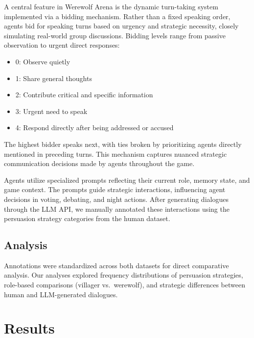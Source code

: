 \documentclass[
  letterpaper,
  DIV=11,
  numbers=noendperiod]{scrreprt}
\providecommand{\tightlist}{%
  \setlength{\itemsep}{0pt}\setlength{\parskip}{0pt}}
\begin{document}
A central feature in Werewolf Arena is the dynamic turn-taking system
implemented via a bidding mechanism. Rather than a fixed speaking order,
agents bid for speaking turns based on urgency and strategic necessity,
closely simulating real-world group discussions. Bidding levels range
from passive observation to urgent direct responses:

\begin{itemize}
\tightlist
\item
  0: Observe quietly
\item
  1: Share general thoughts
\item
  2: Contribute critical and specific information
\item
  3: Urgent need to speak
\item
  4: Respond directly after being addressed or accused
\end{itemize}

The highest bidder speaks next, with ties broken by prioritizing agents
directly mentioned in preceding turns. This mechanism captures nuanced
strategic communication decisions made by agents throughout the game.

Agents utilize specialized prompts reflecting their current role, memory
state, and game context. The prompts guide strategic interactions,
influencing agent decisions in voting, debating, and night actions.
After generating dialogues through the LLM API, we manually annotated
these interactions using the persuasion strategy categories from the
human dataset.

\section{Analysis}\label{analysis}

Annotations were standardized across both datasets for direct
comparative analysis. Our analyses explored frequency distributions of
persuasion strategies, role-based comparisons (villager vs.~werewolf),
and strategic differences between human and LLM-generated dialogues.

\chapter{Results}\label{results}
\end{document}
